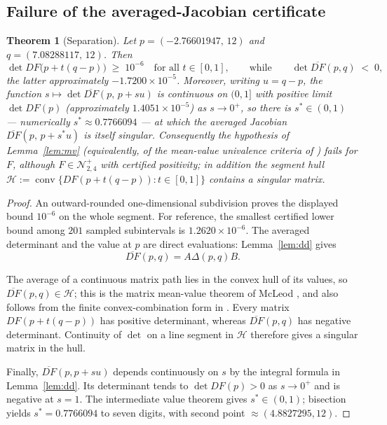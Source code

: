 \documentclass[11pt]{article}
\newtheorem{theorem}{Theorem}[section]
\theoremstyle{definition}
\theoremstyle{remark}
\begin{document}
\subsection{Failure of the averaged-Jacobian certificate}

\begin{theorem}[Separation]\label{thm:sep}
Let $p=(-2.76601947,\,12)$ and $q=(7.08288117,\,12)$. Then
\[
\det DF\bigl(p+t(q-p)\bigr)\;\ge\;10^{-6}
\quad\text{for all }t\in[0,1],
\qquad\text{while}\qquad
\det\overline{DF}(p,q)\;<\;0,
\]
the latter approximately $-1.7200\times10^{-5}$.
Moreover, writing $u=q-p$, the function
$s\mapsto\det\overline{DF}(p,\,p+su)$ is continuous on $(0,1]$ with
positive limit $\det DF(p)$ (approximately $1.4051\times10^{-5}$) as
$s\to0^{+}$, so there is
$s^{*}\in(0,1)$ --- numerically $s^{*}\approx0.7766094$ --- at which the
averaged Jacobian $\overline{DF}(p,\,p+s^{*}u)$ is itself
\emph{singular}. Consequently the hypothesis of Lemma~\ref{lem:mv}
(equivalently, of the mean-value univalence criteria of
\cite{mcleod,parthasarathy,fmr}) fails for $F$, although
$F\in\mathcal N^{+}_{2,4}$ with certified positivity; in addition the
segment hull
$\mathcal H:=\operatorname{conv}\{DF(p+t(q-p)):t\in[0,1]\}$ contains a
singular matrix.
\end{theorem}

\begin{proof}
An outward-rounded one-dimensional subdivision proves the displayed
bound $10^{-6}$ on the whole segment. For reference, the smallest
certified lower bound among $201$ sampled subintervals is
$1.2620\times10^{-6}$. The averaged determinant and the value at $p$ are
direct evaluations: Lemma~\ref{lem:dd} gives
\[
\overline{DF}(p,q)=A\Delta(p,q)B.
\]

The average of a continuous matrix path lies in the convex hull of its
values, so $\overline{DF}(p,q)\in\mathcal H$; this is the matrix
mean-value theorem of McLeod \cite{mcleod}, and also follows from the
finite convex-combination form in \cite[Prop.~4.3]{fmr}. Every matrix
$DF(p+t(q-p))$ has positive determinant, whereas
$\overline{DF}(p,q)$ has negative determinant. Continuity of $\det$ on a
line segment in $\mathcal H$ therefore gives a singular matrix in the
hull.

Finally, $\overline{DF}(p,p+su)$ depends continuously on $s$ by the
integral formula in Lemma~\ref{lem:dd}. Its determinant tends to
$\det DF(p)>0$ as $s\to0^+$ and is negative at $s=1$. The intermediate
value theorem gives $s^*\in(0,1)$; bisection yields
$s^*=0.7766094$ to seven digits, with second point
$\approx(4.8827295,12)$.
\end{proof}
\end{document}
